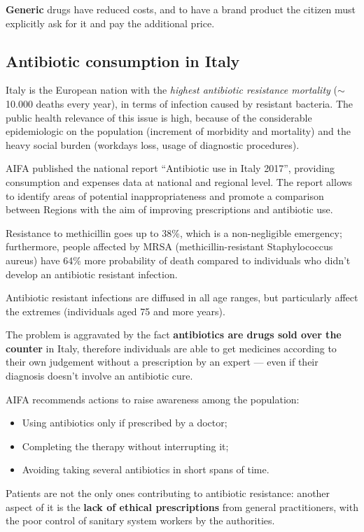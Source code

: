 \textbf{Generic} drugs have reduced costs, and to have a brand product the citizen must explicitly ask for it and pay the additional price\cite{ticket}.

\subsection{Antibiotic consumption in Italy}
Italy is the European nation with the \textit{highest antibiotic resistance mortality} ($\sim$10.000 deaths every year), in terms of infection caused by resistant bacteria\cite{repubblica}. The public health relevance of this issue is high, because of the considerable epidemiologic on the population (increment of morbidity and mortality) and the heavy social burden (workdays loss, usage of diagnostic procedures)\cite{aifa2017}.

AIFA published the national report ``Antibiotic use in Italy 2017'', providing consumption and expenses data at national and regional level. The report allows to identify areas of potential inappropriateness and promote a comparison between Regions with the aim of improving prescriptions and antibiotic use.

Resistance to methicillin goes up to 38\%, which is a non-negligible emergency; furthermore, people affected by MRSA (methicillin-resistant Staphylococcus aureus) have 64\% more probability of death compared to individuals who didn't develop an antibiotic resistant infection.

Antibiotic resistant infections are diffused in all age ranges, but particularly affect the extremes (individuals aged 75 and more years). 

The problem is aggravated by the fact \textbf{antibiotics are drugs sold over the counter} in Italy, therefore individuals are able to get medicines according to their own judgement without a prescription by an expert --- even if their diagnosis doesn't involve an antibiotic cure.

AIFA recommends actions to raise awareness among the population\cite{aifaar}:
\begin{itemize}
	\item Using antibiotics only if prescribed by a doctor;
	\item Completing the therapy without interrupting it;
	\item Avoiding taking several antibiotics in short spans of time.
\end{itemize}

Patients are not the only ones contributing to antibiotic resistance: another aspect of it is the \textbf{lack of ethical prescriptions} from general practitioners, with the poor control of sanitary system workers by the authorities. 

